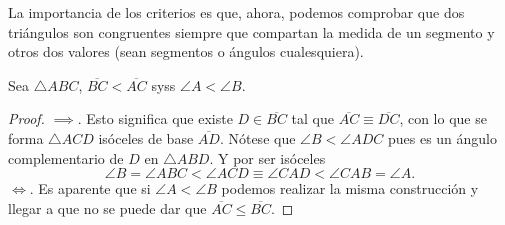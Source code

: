 \documentclass[11pt,a4paper]{book}
\begin{document}
La importancia de los criterios es que, ahora, podemos comprobar que dos triángulos son congruentes siempre que compartan la medida de un segmento y otros dos valores (sean segmentos o ángulos cualesquiera).
\begin{thm}\label{thm:angle-side-inequality}
Sea $\triangle ABC$, $\overline{BC}\lt\overline{AC}$ syss $\angle A\lt\angle B$.
\end{thm}
\begin{proof}
$\implies$. Esto significa que existe $D\in\overline{BC}$ tal que $\overline{AC}\equiv\overline{DC}$, con lo que se forma $\triangle ACD$ isóceles de base $\overline{AD}$. Nótese que $\angle B\lt\angle ADC$ pues es un ángulo complementario de $D$ en $\triangle ABD$. Y por ser isóceles
$$\angle B=\angle ABC\lt\angle ACD\equiv\angle CAD\lt\angle CAB=\angle A.$$
$\Leftrightarrow$. Es aparente que si $\angle A\lt\angle B$ podemos realizar la misma construcción y llegar a que no se puede dar que $\overline{AC}\leq\overline{BC}$.
\end{proof}
\end{document}
